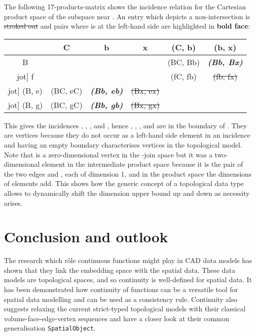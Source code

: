 \documentclass[5p]{elsarticle}
\begin{document}
The following 17-products-matrix shows the incidence relation for the Cartesian product space of 
the subspace near . An entry which depicts a non-intersection is \sout{stroked out} and 
pairs where  is at the left-hand side are highlighted in \textbf{bold face}:
\begin{center}
\newcommand{\so}[1]{\sout{#1}}
\newcommand{\bi}[1]{\textbf{\textit{#1}}}
\it
\begin{tabular}{@{}c@{~}|@{~}c@{~}c@{~}c@{~}|@{~}c@{~}c@{}}
       &    C     &       b       &       x      &  (C, b)  &    (b, x)     \\\hline
 B     &          &               &              & (BC, Bb) & \bi{(Bb, Bx)} \\jot] 
 f     &          &               &              & (fC, fb) & \so{(fb, fx)} \\jot] \hline
(B, e) & (BC, eC) & \bi{(Bb, eb)} & \so{(Bx, ex)} \\jot] 
(B, g) & (BC, gC) & \bi{(Bb, gb)} & \so{(Bx, gx)} 
\end{tabular}
\end{center}
This gives the incidences , , , and , 
hence , , , and  are in the boundary of . They are 
vertices because they do not occur as a left-hand side element in an incidence and 
having an empty boundary characterises vertices in the topological model. 
Note that  is a zero-dimensional vertex in the -join space 
but it was a two-dimensional element in the intermediate product space because it is the pair  
of the two edges  and , each of dimension 1, and in the product space the dimensions of 
elements add. 
This shows how the generic concept of a topological data type allows to dynamically shift the 
dimension upper bound up and down as necessity arises. 


\section{Conclusion and outlook}

The research which r\^ole continuous functions might play in CAD data models has 
shown that they link the embedding space with the spatial data. 
These data models are topological spaces, and so continuity is well-defined for spatial data. 
It has been demonstrated how continuity of functions can be a versatile tool for spatial 
data modelling and can be used as a consistency rule. 
Continuity also suggests relaxing the current strict-typed topological models with their 
classical volume-face-edge-vertex sequences and have a closer look at their common generalisation 
\texttt{SpatialObject}. 
\end{document}
